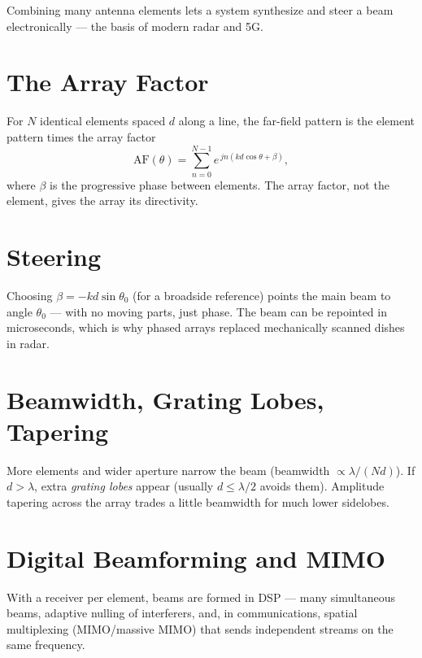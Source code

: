 Combining many antenna elements lets a system synthesize and steer a beam
electronically --- the basis of modern radar and 5G.

\section{The Array Factor}
For $N$ identical elements spaced $d$ along a line, the far-field pattern is the
element pattern times the array factor
\[ \text{AF}(\theta) = \sum_{n=0}^{N-1} e^{\,j n (k d \cos\theta + \beta)}, \]
where $\beta$ is the progressive phase between elements. The array factor, not the
element, gives the array its directivity.

\section{Steering}
Choosing $\beta = -k d \sin\theta_0$ (for a broadside reference) points the main
beam to angle $\theta_0$ --- with no moving parts, just phase. The beam can be
repointed in microseconds, which is why phased arrays replaced mechanically
scanned dishes in radar.

\section{Beamwidth, Grating Lobes, Tapering}
More elements and wider aperture narrow the beam (beamwidth $\propto \lambda/(Nd)$).
If $d>\lambda$, extra \emph{grating lobes} appear (usually $d\le\lambda/2$ avoids
them). Amplitude tapering across the array trades a little beamwidth for much lower
sidelobes.

\section{Digital Beamforming and MIMO}
With a receiver per element, beams are formed in DSP --- many simultaneous beams,
adaptive nulling of interferers, and, in communications, spatial multiplexing
(MIMO/massive MIMO) that sends independent streams on the same frequency.

